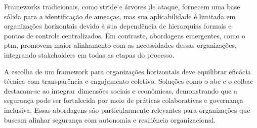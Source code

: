 Frameworks tradicionais, como \gls{stride} e árvores de ataque, fornecem uma
base sólida para a identificação de ameaças, mas sua aplicabilidade é
limitada em organizações horizontais devido à sua dependência de
hierarquias formais e pontos de controle centralizados. Em contraste,
abordagens emergentes, como o \gls{ptm},
promovem maior alinhamento com as necessidades dessas organizações,
integrando stakeholders em todas as etapas do processo.

A escolha de um framework para organizações horizontais deve
equilibrar eficácia técnica com transparência e engajamento coletivo.
Soluções como o \gls{abc} e o  \gls{colbac} destacam-se ao integrar dimensões
sociais e econômicas, demonstrando que a segurança pode ser
fortalecida por meio de práticas colaborativas e governança inclusiva.
Essas abordagens são particularmente relevantes para organizações que
buscam alinhar segurança com autonomia e resiliência organizacional.
